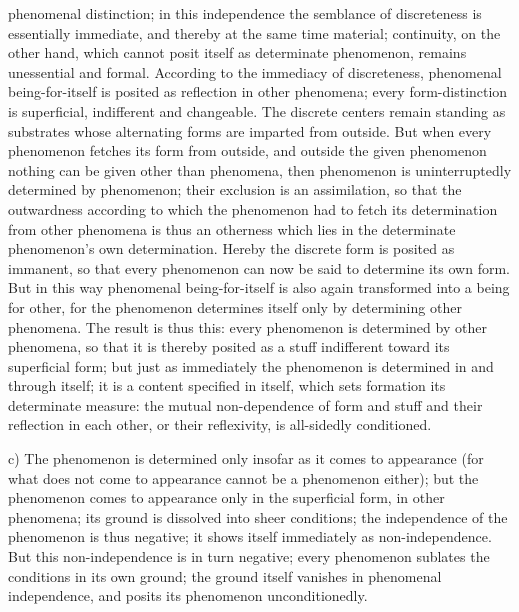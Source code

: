 \documentclass[12pt,a4paper,openany]{book}
\newcommand{\opage}[1]{\marginnote{\footnotesize\textit{[#1]}}}
\begin{document}
phenomenal distinction; in this independence
\setcounter{footnote}{0}%
\opage{155}the semblance of discreteness is essentially immediate, and thereby
at the same time material; continuity, on the other hand, which cannot
posit itself as determinate phenomenon, remains unessential
and formal. According to the immediacy of discreteness,
phenomenal being-for-itself is posited as
reflection in other phenomena; every form-distinction
is superficial, indifferent and changeable. The discrete
centers remain standing as substrates
whose alternating forms are imparted from outside. But when
every phenomenon fetches its form from outside, and
outside the given phenomenon nothing can be given other
than phenomena, then phenomenon is uninterruptedly determined
by phenomenon; their exclusion is an assimilation,
so that the outwardness according to which the phenomenon
had to fetch its determination from other phenomena
is thus an otherness which lies in the determinate
phenomenon's own determination. Hereby the discrete
form is posited as immanent, so that every phenomenon
can now be said to determine its own form. But
in this way phenomenal being-for-itself is also
again transformed into a being for other, for the phenomenon
determines itself only by determining
other phenomena. The result is thus this:
every phenomenon is determined by other phenomena,
so that it is thereby posited as a stuff indifferent toward its superficial
form; but just as immediately the
phenomenon is determined in and through itself; it is a content
specified in itself, which sets formation its
determinate measure: the mutual non-dependence of form and stuff
and their reflection in each other, or their reflexivity,
is all-sidedly conditioned.

c) The phenomenon is determined only insofar as it comes
to appearance (for what does not come to appearance cannot
be a phenomenon either); but the phenomenon comes
\setcounter{footnote}{0}%
\opage{156}to appearance only in the superficial form, in other phenomena;
its ground is dissolved into sheer conditions; the independence of the phenomenon is thus negative;
it shows itself immediately as non-independence. But
this non-independence is in turn negative; every phenomenon
sublates the conditions in its own ground;
the ground itself vanishes in phenomenal independence,
and posits its phenomenon unconditionedly.
\end{document}

